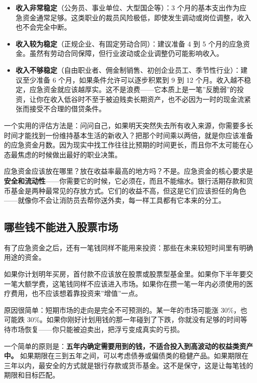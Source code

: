 \documentclass[a4paper,11pt,oneside,fontset=none,UTF8,zihao=-4]{ctexbook}
\providecommand{\tightlist}{\setlength{\itemsep}{2pt}\setlength{\parskip}{1pt}}
\begin{document}
\begin{itemize}
\tightlist
\item
  \textbf{收入非常稳定}（公务员、事业单位、大型国企等）：3
  个月的基本支出作为应急资金通常足够。这类职业的裁员风险极低，即使发生调动或岗位调整，收入也不会完全中断。
\item
  \textbf{收入较为稳定}（正规企业、有固定劳动合同）：建议准备 4 到 5
  个月的应急资金。虽然有劳动合同保障，但行业波动或企业调整仍可能影响收入。
\item
  \textbf{收入不够稳定}（自由职业者、佣金制销售、初创企业员工、季节性行业）：建议至少准备
  6 个月，如果条件允许可以逐步积累到 9 到 12
  个月。收入越不稳定，应急资金就应该越厚实。这不是浪费------它本质上是一笔''反脆弱''的投资，让你在收入低谷时不至于被迫贱卖长期资产，也不必因为一时的现金流紧张而接受不合理的借贷条件。
\end{itemize}

一个实用的评估方法是：问问自己，如果明天突然失去所有收入来源，你需要多长时间才能找到一份维持基本生活的新收入？把那个时间乘以两倍，就是你应该准备的应急资金月数。因为现实中找工作往往比预期的时间更长，而且你不太可能在心态最焦虑的时候做出最好的职业决策。

应急资金应该放在哪里？放在收益率最高的地方吗？不是。应急资金的核心要求是\textbf{安全和流动性}------你需要它的时候，它必须在，而且不能缩水。银行活期存款和货币基金是两种最常见的存放方式。它们的收益不高，但这是它们应该担任的角色------就像你不会让消防员去帮你送外卖，每一样工具都有它本来的分工。

\subsection{哪些钱不能进入股票市场}\label{ux54eaux4e9bux94b1ux4e0dux80fdux8fdbux5165ux80a1ux7968ux5e02ux573a}

有了应急资金之后，还有一笔钱同样不能用来投资：那些在未来较短时间里有明确用途的资金。

如果你计划明年买房，首付款不应该放在股票或股票型基金里。如果你下半年要交一笔大额学费，这笔钱同样不应该进入市场。如果你在攒一笔一年内必须使用的医疗费用，也不应该想着靠投资来''增值''一点。

原因很简单：短期市场的走向是完全不可预测的。某一年的市场可能涨
30\%，也可能跌
30\%。如果你刚好计划用钱的那一年碰到了下跌，你就没有足够的时间等待市场恢复------你只能被迫卖出，把浮亏变成真实的亏损。

一个简单的原则是：\textbf{五年内确定需要用到的钱，不适合投入到高波动的权益类资产中。}
如果期限在三到五年之间，可以考虑债券或偏债类的稳健产品。如果期限在三年以内，最安全的方式就是银行存款或货币基金。这不是保守，这是让每笔钱的期限和目标匹配。
\end{document}
